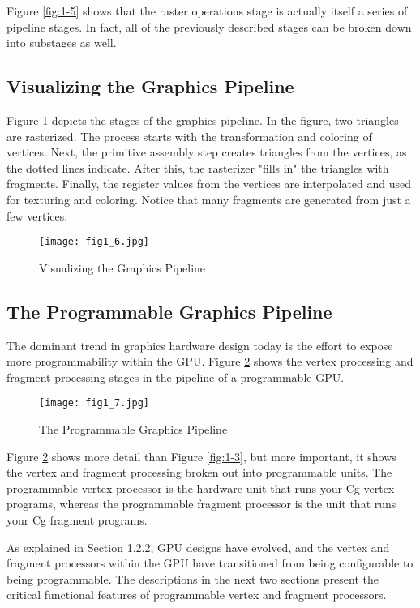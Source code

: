 \documentclass[../main.tex]{subfiles}
\begin{document}
Figure \ref{fig:1-5} shows that the raster operations stage is actually itself a series of pipeline stages. In fact, all of the previously described stages can be broken down into substages as well.

\subsection*{Visualizing the Graphics Pipeline}

Figure \ref{fig:1-6} depicts the stages of the graphics pipeline. In the figure, two triangles are rasterized. The process starts with the transformation and coloring of vertices. Next, the primitive assembly step creates triangles from the vertices, as the dotted lines indicate. After this, the rasterizer "fills in" the triangles with fragments. Finally, the register values from the vertices are interpolated and used for texturing and coloring. Notice that many fragments are generated from just a few vertices.

\begin{figure}
    \centering
    \texttt{[image: fig1\_6.jpg]}
    \caption{Visualizing the Graphics Pipeline}
    \label{fig:1-6}
\end{figure}

\subsection{The Programmable Graphics Pipeline}

The dominant trend in graphics hardware design today is the effort to expose more programmability within the GPU. Figure \ref{fig:1-7} shows the vertex processing and fragment processing stages in the pipeline of a programmable GPU.

\begin{figure}
    \centering
    \texttt{[image: fig1\_7.jpg]}
    \caption{The Programmable Graphics Pipeline}
    \label{fig:1-7}
\end{figure}

Figure \ref{fig:1-7} shows more detail than Figure \ref{fig:1-3}, but more important, it shows the vertex and fragment processing broken out into programmable units. The programmable vertex processor is the hardware unit that runs your Cg vertex programs, whereas the programmable fragment processor is the unit that runs your Cg fragment programs.

As explained in Section 1.2.2, GPU designs have evolved, and the vertex and fragment processors within the GPU have transitioned from being configurable to being programmable. The descriptions in the next two sections present the critical functional features of programmable vertex and fragment processors.
\end{document}
